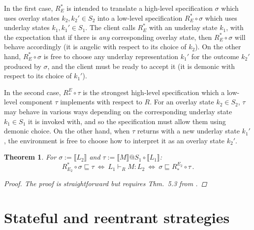 \documentclass[draft,11pt]{report}
\newtheorem{lemma}{Lemma}
\newtheorem{theorem}{Theorem}
\begin{document}
In the first case,
$R^*_E$ is intended to translate
a high-level specification $\sigma$
which uses overlay states $k_2, k_2' \in S_2$
into a low-level specification $R^*_E \circ \sigma$
which uses underlay states
$k_1, k_1' \in S_1$.
The client calls $R^*_E$
with an underlay state $k_1$,
with the expectation that if there is \emph{any}
corresponding overlay state,
then $R^*_E \circ \sigma$ will behave accordingly
(it is angelic with respect to its choice of $k_2$).
On the other hand,
$R^*_E \circ \sigma$ is free to choose any underlay representation
$k_1'$
for the outcome $k_2'$ produced by $\sigma$,
and the client must be ready to accept it
(it is demonic with respect to its choice of $k_1'$).

In the second case,
$R_*^E \circ \tau$ is %
the strongest high-level specification
which a low-level component $\tau$ implements
with respect to $R$.
For an overlay state $k_2 \in S_2$,
$\tau$ may behave in various ways
depending on the corresponding underlay state $k_1 \in S_1$
it is invoked with,
and so the specification must allow them using demonic choice.
On the other hand,
when $\tau$ returns with a new underlay state $k_1'$,
the environment is free to choose
how to interpret it as an overlay state $k_2'$.


\begin{theorem}
For
$\sigma := \llbracket L_2 \rrbracket$ and
$\tau := \llbracket M \rrbracket @ S_1 \circ \llbracket L_1 \rrbracket$:
\[
  R^*_{E_2} \!\circ \sigma \sqsubseteq \tau
  \: \Leftrightarrow \:
  L_1 \vdash_R M : L_2
  \: \Leftrightarrow \:
  \sigma \sqsubseteq R_*^{E_2} \!\circ \tau \,.
\]
\begin{proof}
The proof is straightforward but requires
Thm.~5.3 from \citet{dndf}.
\end{proof}
\end{theorem}




\chapter{Stateful and reentrant strategies} \label{sec:gamesem} %
\end{document}
